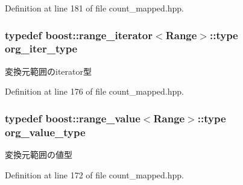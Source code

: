 \-Definition at line 181 of file count\-\_\-mapped.\-hpp.

\hypertarget{classyuh_1_1range__detail_1_1count__mapped__range_a7d85ad9a5f85d7a869dd7ea9557eee8b}{
\subsubsection[{org\-\_\-iter\-\_\-type}]{\setlength{\rightskip}{0pt plus 5cm}typedef boost\-::range\-\_\-iterator$<$\-Range$>$\-::type {\bf org\-\_\-iter\-\_\-type}}}\label{dc/d9d/classyuh_1_1range__detail_1_1count__mapped__range_a7d85ad9a5f85d7a869dd7ea9557eee8b}
変換元範囲のiterator型 

\-Definition at line 176 of file count\-\_\-mapped.\-hpp.

\hypertarget{classyuh_1_1range__detail_1_1count__mapped__range_a69559cacbf423e64c6efb8e1644ea37e}{
\subsubsection[{org\-\_\-value\-\_\-type}]{\setlength{\rightskip}{0pt plus 5cm}typedef boost\-::range\-\_\-value$<$\-Range$>$\-::type {\bf org\-\_\-value\-\_\-type}}}\label{dc/d9d/classyuh_1_1range__detail_1_1count__mapped__range_a69559cacbf423e64c6efb8e1644ea37e}
変換元範囲の値型 

\-Definition at line 172 of file count\-\_\-mapped.\-hpp.



